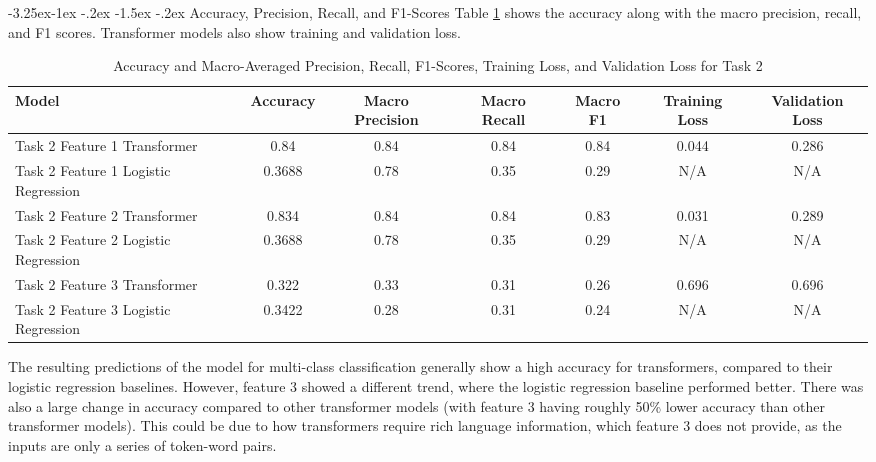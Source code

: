 \documentclass[10.7pt, onecolumn]{article}
\makeatletter
\renewcommand\subsubsection{\@startsection{subsubsection}{3}{\z@}%
	{-3.25ex\@plus -1ex \@minus -.2ex}%
    {-1.5ex \@plus -.2ex}%
    {\normalfont\itshape}}
\makeatother
\begin{document}
\subsubsection{Accuracy, Precision, Recall, and F1-Scores}
Table \ref{tab:task2accEtc} shows the accuracy along with the macro precision, recall, and F1 scores. Transformer models also show training and validation loss.
\begin{table}[H]
  \small
  \centering
  \setlength{\tabcolsep}{4pt} 
  \begin{tabular}{|p{3cm}|c|c|c|c|c|c|}
    \hline
    \textbf{Model} & \textbf{Accuracy} & \textbf{Macro Precision} & \textbf{Macro Recall} & \textbf{Macro F1}  & \textbf{Training Loss} & \textbf{Validation Loss}\\
    \hline
    Task 2 Feature 1 Transformer & 0.84  & 0.84  & 0.84  & 0.84 &0.044 &0.286\\
    \hline
    Task 2 Feature 1 Logistic Regression & 0.3688 & 0.78  & 0.35  & 0.29 & N/A &N/A\\
    \hline
    Task 2 Feature 2 Transformer & 0.834 & 0.84  & 0.84  & 0.83 &0.031 &0.289 \\
    \hline
    Task 2 Feature 2 Logistic Regression & 0.3688 & 0.78  & 0.35  & 0.29 &N/A &N/A\\
    \hline
    Task 2 Feature 3 Transformer & 0.322 & 0.33  & 0.31  & 0.26 &0.696 &0.696\\
    \hline
    Task 2 Feature 3 Logistic Regression & 0.3422 & 0.28  & 0.31  & 0.24 &N/A &N/A\\
    \hline
  \end{tabular}
  \caption{Accuracy and Macro-Averaged Precision, Recall, F1-Scores, Training Loss, and Validation Loss for Task 2}
  \label{tab:task2accEtc}
\end{table}

The resulting predictions of the model for multi-class classification generally show a high accuracy for transformers, compared to their logistic regression baselines. However, feature 3 showed a different trend, where the logistic regression baseline performed better. There was also a large change in accuracy compared to other transformer models (with feature 3 having roughly 50\% lower accuracy than other transformer models). This could be due to how transformers require rich language information, which feature 3 does not provide, as the inputs are only a series of token-word pairs.
\end{document}
